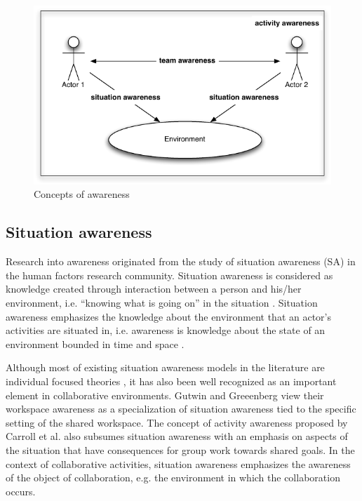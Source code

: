 \begin{figure}[htbp] %
   \centering
   \includegraphics{concepts_of_awareness.pdf} 
   \caption{Concepts of awareness}
   \label{fig:concepts_of_awareness}
\end{figure}


\subsection{Situation awareness} %
\label{sub:situation_awareness}
Research into awareness originated from the study of situation awareness (SA) in the human factors research community. Situation awareness is considered as knowledge created through interaction between a person and his/her environment, i.e. ``knowing what is going on'' in the situation \cite{Endsley1995}. Situation awareness emphasizes the knowledge about the environment that an actor's activities are situated in, i.e. awareness is knowledge about the state of an environment bounded in time and space \cite{Adams1995}.

Although most of existing situation awareness models in the literature are individual focused theories \cite{Salmon2008}, it has also been well recognized as an important element in collaborative environments. Gutwin and Greeenberg \cite{Gutwin2002} view their workspace awareness as a specialization of situation awareness tied to the specific setting of the shared workspace. The concept of activity awareness proposed by Carroll et al. \cite{carroll2003a} also subsumes situation awareness with an emphasis on aspects of the situation that have consequences for group work towards shared goals. In the context of collaborative activities, situation awareness emphasizes the awareness of the object of collaboration, e.g. the environment in which the collaboration occurs.

